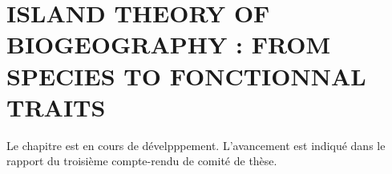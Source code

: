 \chapter{ISLAND THEORY OF BIOGEOGRAPHY : FROM SPECIES TO FONCTIONNAL TRAITS}

Le chapitre est en cours de dévelpppement. L'avancement est indiqué dans le rapport du troisième compte-rendu de comité de thèse.
